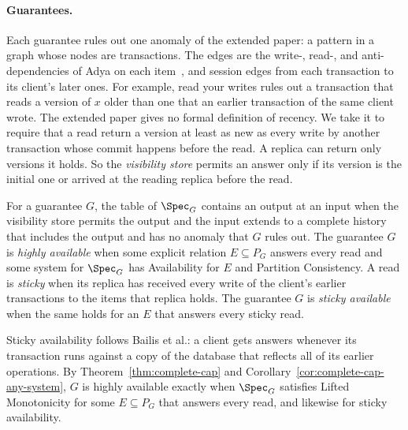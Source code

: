 \paragraph{Guarantees.}
Each guarantee rules out one anomaly of the extended paper: a pattern in a
graph whose nodes are transactions.  The edges are the write-, read-, and
anti-dependencies of Adya on each item~\cite{adya1999weakconsistency}, and
session edges from each transaction to its client's later ones.  For example,
read your writes rules out a transaction that reads a version of $x$ older
than one that an earlier transaction of the same client wrote.  The extended
paper gives no formal definition of recency.  We take it to require that a
read return a version at least as new as every write by another transaction
whose commit happens before the read.  A replica can return only versions it
holds.  So the \emph{visibility store} permits an answer only if its version is the initial
one or arrived at the reading replica before the read.

\begin{definition}
\label{def:hat-availability}
For a guarantee $G$, the table of $\Spec_G$ contains an output at an input when
the visibility store permits the output and the input extends to a complete
history that includes the output and has no anomaly that $G$ rules out.  The
guarantee $G$ is \emph{highly available} when some explicit relation
$E\subseteq P_G$ answers every read and some system for $\Spec_G$ has
Availability for $E$ and Partition Consistency.  A read is \emph{sticky} when
its replica has received every write of the client's earlier transactions to
the items that replica holds.  The guarantee $G$ is \emph{sticky available}
when the same holds for an $E$ that answers every sticky read.
\end{definition}

Sticky availability follows Bailis et al.: a client gets answers whenever its
transaction runs against a copy of the database that reflects all of its
earlier operations.  By Theorem~\ref{thm:complete-cap} and
Corollary~\ref{cor:complete-cap-any-system}, $G$ is highly available exactly
when $\Spec_G$ satisfies Lifted Monotonicity for some $E\subseteq P_G$ that
answers every read, and likewise for sticky availability.

